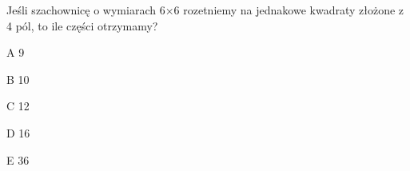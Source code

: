 \begin{tresc}
Jeśli szachownicę o wymiarach 6×6 rozetniemy na jednakowe kwadraty złożone z 4 pól, to ile części otrzymamy?
\end{tresc}
\begin{wariant}{A} 9 \end{wariant}
\begin{wariant}{B} 10 \end{wariant}
\begin{wariant}{C} 12 \end{wariant}
\begin{wariant}{D} 16 \end{wariant}
\begin{wariant}{E} 36 \end{wariant}
